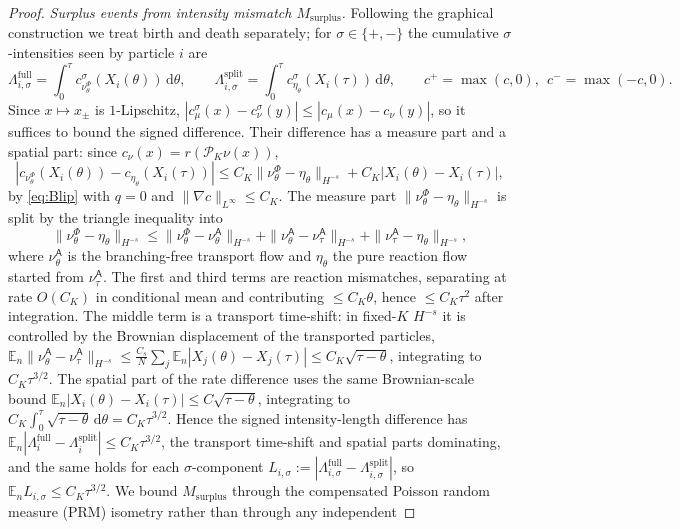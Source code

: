\documentclass[a4paper,fleqn]{cas-sc}
\theoremstyle{definition}
\theoremstyle{remark}
\begin{document}
\begin{proof}
\emph{Surplus events from intensity mismatch $M_{\mathrm{surplus}}$.} Following the
graphical construction we treat birth and death separately; for $\sigma\in\{+,-\}$
the cumulative $\sigma$-intensities seen by particle $i$ are
\[
\Lambda^{\mathrm{full}}_{i,\sigma}=\int_0^\tau c^{\sigma}_{\nu^\Phi_\theta}(X_i(\theta))\,\mathrm d\theta,
\qquad
\Lambda^{\mathrm{split}}_{i,\sigma}=\int_0^\tau c^{\sigma}_{\eta_\theta}(X_i(\tau))\,\mathrm d\theta,
\qquad c^{+}=\max(c,0),\ \ c^{-}=\max(-c,0).
\]
Since $x\mapsto x_\pm$ is $1$-Lipschitz,
$|c^{\sigma}_{\mu}(x)-c^{\sigma}_{\nu}(y)|\le|c_{\mu}(x)-c_{\nu}(y)|$, so it suffices
to bound the signed difference.
Their difference has a measure part and a spatial part: since
$c_\nu(x)=r(\mathcal P_K\nu(x))$,
\[
|c_{\nu^\Phi_\theta}(X_i(\theta))-c_{\eta_\theta}(X_i(\tau))|
\le C_K\|\nu^\Phi_\theta-\eta_\theta\|_{H^{-s}}+C_K|X_i(\theta)-X_i(\tau)|,
\]
by \eqref{eq:Blip} with $q=0$ and $\|\nabla c\|_{L^\infty}\le C_K$. The measure
part $\|\nu^\Phi_\theta-\eta_\theta\|_{H^{-s}}$ is split by the triangle
inequality into
\[
\|\nu^\Phi_\theta-\eta_\theta\|_{H^{-s}}
\le\|\nu^\Phi_\theta-\nu^{\mathsf A}_\theta\|_{H^{-s}}
+\|\nu^{\mathsf A}_\theta-\nu^{\mathsf A}_\tau\|_{H^{-s}}
+\|\nu^{\mathsf A}_\tau-\eta_\theta\|_{H^{-s}},
\]
where $\nu^{\mathsf A}_\theta$ is the branching-free transport flow and
$\eta_\theta$ the pure reaction flow started from $\nu^{\mathsf A}_\tau$. The
first and third terms are reaction mismatches, separating at rate $O(C_K)$ in
conditional mean and contributing $\le C_K\theta$, hence $\le C_K\tau^2$ after
integration. The middle term is a transport time-shift: in fixed-$K$ $H^{-s}$ it
is controlled by the Brownian displacement of the transported particles,
$\mathbb E_n\|\nu^{\mathsf A}_\theta-\nu^{\mathsf A}_\tau\|_{H^{-s}}\le
\frac{C_s}{N}\sum_j\mathbb E_n|X_j(\theta)-X_j(\tau)|\le C_K\sqrt{\tau-\theta}$,
integrating to $C_K\tau^{3/2}$. The spatial part of the rate difference uses the
same Brownian-scale bound $\mathbb E_n|X_i(\theta)-X_i(\tau)|\le C\sqrt{\tau-\theta}$,
integrating to $C_K\int_0^\tau\sqrt{\tau-\theta}\,\mathrm d\theta=C_K\tau^{3/2}$.
Hence the signed intensity-length difference has
$\mathbb E_n|\Lambda^{\mathrm{full}}_i-\Lambda^{\mathrm{split}}_i|\le C_K\tau^{3/2}$,
the transport time-shift and spatial parts dominating, and the same holds for each
$\sigma$-component $L_{i,\sigma}:=|\Lambda^{\mathrm{full}}_{i,\sigma}-\Lambda^{\mathrm{split}}_{i,\sigma}|$,
so $\mathbb E_n L_{i,\sigma}\le C_K\tau^{3/2}$. We bound $M_{\mathrm{surplus}}$ through the
compensated Poisson random measure (PRM) isometry rather than through any independent

\end{proof}
\end{document}
